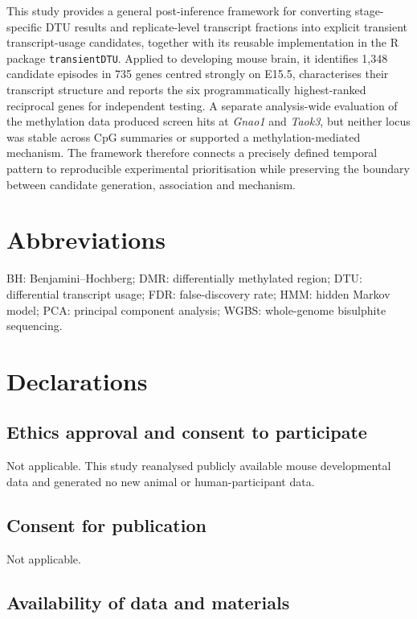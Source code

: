 \documentclass[11pt,a4paper]{article}
\begin{document}
This study provides a general post-inference framework for converting stage-specific DTU results and replicate-level transcript fractions into explicit transient transcript-usage candidates, together with its reusable implementation in the R package \texttt{transientDTU}. Applied to developing mouse brain, it identifies 1,348 candidate episodes in 735 genes centred strongly on E15.5, characterises their transcript structure and reports the six programmatically highest-ranked reciprocal genes for independent testing. A separate analysis-wide evaluation of the methylation data produced screen hits at \textit{Gnao1} and \textit{Taok3}, but neither locus was stable across CpG summaries or supported a methylation-mediated mechanism. The framework therefore connects a precisely defined temporal pattern to reproducible experimental prioritisation while preserving the boundary between candidate generation, association and mechanism.

\section*{Abbreviations}

BH: Benjamini--Hochberg; DMR: differentially methylated region; DTU: differential transcript usage; FDR: false-discovery rate; HMM: hidden Markov model; PCA: principal component analysis; WGBS: whole-genome bisulphite sequencing.

\section*{Declarations}

\subsection*{Ethics approval and consent to participate}

Not applicable. This study reanalysed publicly available mouse developmental data and generated no new animal or human-participant data.

\subsection*{Consent for publication}

Not applicable.

\subsection*{Availability of data and materials}
\end{document}
